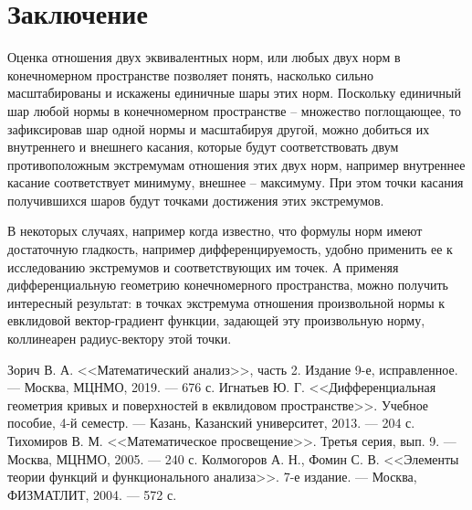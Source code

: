 \documentclass{article}
\begin{document}
\newpage
\section{Заключение}
Оценка отношения двух эквивалентных норм, или любых двух норм в конечномерном пространстве позволяет понять, насколько сильно масштабированы и искажены единичные шары этих норм. Поскольку единичный шар любой нормы в конечномерном пространстве -- множество поглощающее, то зафиксировав шар одной нормы и масштабируя другой, можно добиться их внутреннего и внешнего касания, которые будут соответствовать двум противоположным экстремумам отношения этих двух норм, например внутреннее касание соответствует минимуму, внешнее -- максимуму. При этом точки касания получившихся шаров будут точками достижения этих экстремумов.

В некоторых случаях, например когда известно, что формулы норм имеют достаточную гладкость, например дифференцируемость, удобно применить ее к исследованию экстремумов и соответствующих им точек. А применяя дифференциальную геометрию конечномерного пространства, можно получить интересный результат: в точках экстремума отношения произвольной нормы к евклидовой вектор-градиент функции, задающей эту произвольную норму, коллинеарен радиус-вектору этой точки.

\newpage
\begin{thebibliography}{9}
Зорич В. А. <<Математический анализ>>, часть 2. Издание 9-е, исправленное. --- Москва, МЦНМО, 2019. --- 676 с.
Игнатьев Ю. Г. <<Дифференциальная геометрия кривых и поверхностей в еквлидовом пространстве>>. Учебное пособие, 4-й семестр. --- Казань, Казанский университет, 2013. --- 204 с.
Тихомиров В. М. <<Математическое просвещение>>. Третья серия, вып. 9. --- Москва, МЦНМО, 2005. --- 240 с.
Колмогоров А. Н., Фомин С. В. <<Элементы теории функций и функционального анализа>>. 7-е издание. --- Москва, ФИЗМАТЛИТ, 2004. --- 572 с.
\end{thebibliography}
\end{document}
